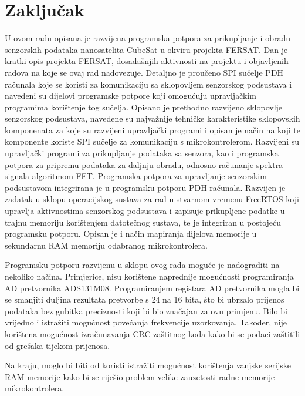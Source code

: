 \chapter{Zaključak}

U ovom radu opisana je razvijena programska potpora za prikupljanje i obradu senzorskih podataka nanosatelita CubeSat u okviru projekta FERSAT. Dan je kratki opis projekta FERSAT, dosadašnjih aktivnosti na projektu i objavljenih radova na koje se ovaj rad nadovezuje. Detaljno je proučeno SPI sučelje PDH računala koje se koristi za komunikaciju sa sklopovljem senzorskog podsustava i navedeni su dijelovi programske potpore koji omogućuju upravljačkim programima korištenje tog sučelja. Opisano je prethodno razvijeno sklopovlje senzorskog podsustava, navedene su najvažnije tehničke karakteristike sklopovskih komponenata za koje su razvijeni upravljački programi i opisan je način na koji te komponente koriste SPI sučelje za komunikaciju s mikrokontrolerom. Razvijeni su upravljački programi za prikupljanje podataka sa senzora, kao i programska potpora za pripremu podataka za daljnju obradu, odnosno računanje spektra signala algoritmom FFT. Programska potpora za upravljanje senzorskim podsustavom integrirana je u programsku potporu PDH računala. Razvijen je zadatak u sklopu operacijskog sustava za rad u stvarnom vremenu FreeRTOS koji upravlja aktivnostima senzorskog podsustava i zapisuje prikupljene podatke u trajnu memoriju korištenjem datotečnog sustava, te je integriran u postojeću programsku potporu. Opisan je i način mapiranja dijelova memorije u sekundarnu RAM memoriju odabranog mikrokontrolera.

Programsku potporu razvijenu u sklopu ovog rada moguće je nadograditi na nekoliko načina. Primjerice, nisu korištene naprednije mogućnosti programiranja AD pretvornika ADS131M08. Programiranjem registara AD pretvornika mogla bi se smanjiti duljina rezultata pretvorbe s 24 na 16 bita, što bi ubrzalo prijenos podataka bez gubitka preciznosti koji bi bio značajan za ovu primjenu. Bilo bi vrijedno i istražiti mogućnost povećanja frekvencije uzorkovanja. Također, nije korištena mogućnost izračunavanja CRC zaštitnog koda kako bi se podaci zaštitili od grešaka tijekom prijenosa.

Na kraju, moglo bi biti od koristi istražiti mogućnost korištenja vanjske serijske RAM memorije kako bi se riješio problem velike zauzetosti radne memorije mikrokontrolera.